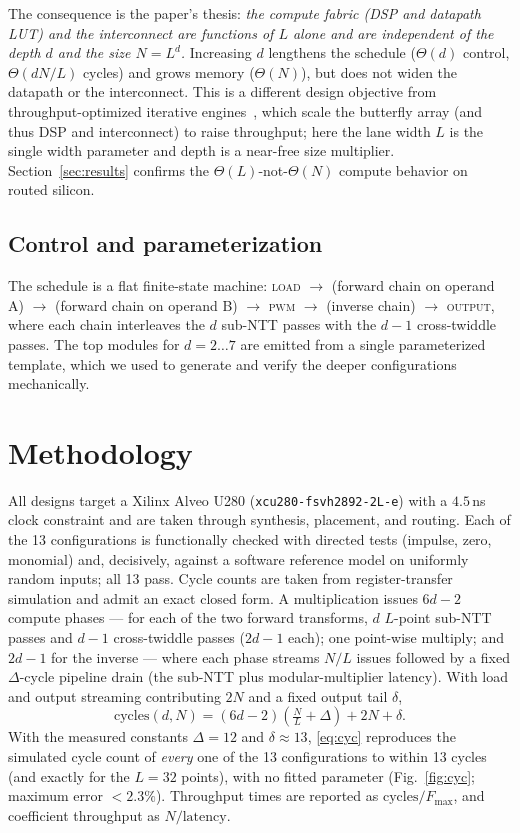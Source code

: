 \documentclass[conference]{IEEEtran}
\begin{document}
The consequence is the paper's thesis: \emph{the compute fabric (DSP and
datapath LUT) and the interconnect are functions of $L$ alone and are
independent of the depth $d$ and the size $N=L^{d}$.} Increasing $d$ lengthens
the schedule ($\Theta(d)$ control, $\Theta(dN/L)$ cycles) and grows memory
($\Theta(N)$), but does not widen the datapath or the interconnect. This is a
different design objective from throughput-optimized iterative
engines~\cite{xing2025}, which scale the butterfly array (and thus DSP and
interconnect) to raise throughput; here the lane width $L$ is the single width
parameter and depth is a near-free size multiplier. Section~\ref{sec:results}
confirms the $\Theta(L)$-not-$\Theta(N)$ compute behavior on routed silicon.

\subsection{Control and parameterization}
The schedule is a flat finite-state machine:
\textsc{load} $\rightarrow$ (forward chain on operand A) $\rightarrow$ (forward
chain on operand B) $\rightarrow$ \textsc{pwm} $\rightarrow$ (inverse chain)
$\rightarrow$ \textsc{output}, where each chain interleaves the $d$ sub-NTT
passes with the $d-1$ cross-twiddle passes. The top modules for $d=2\ldots7$ are
emitted from a single parameterized template, which we used to generate and
verify the deeper configurations mechanically.

\section{Methodology}\label{sec:method}
All designs target a Xilinx Alveo U280 (\texttt{xcu280-fsvh2892-2L-e}) with a
$4.5$\,ns clock constraint and are taken through synthesis, placement, and
routing. Each of the 13 configurations is functionally checked with directed
tests (impulse, zero, monomial) and, decisively, against a software reference
model on uniformly random inputs; all 13 pass. Cycle counts are taken from
register-transfer simulation and admit an exact closed form. A multiplication
issues $6d-2$ compute phases --- for each of the two forward transforms, $d$
$L$-point sub-NTT passes and $d-1$ cross-twiddle passes ($2d-1$ each); one
point-wise multiply; and $2d-1$ for the inverse --- where each phase streams
$N/L$ issues followed by a fixed $\Delta$-cycle pipeline drain (the sub-NTT plus
modular-multiplier latency). With load and output streaming contributing $2N$
and a fixed output tail $\delta$,
\begin{equation}
\mathrm{cycles}(d,N)=(6d-2)\!\left(\tfrac{N}{L}+\Delta\right)+2N+\delta .
\label{eq:cyc}
\end{equation}
With the measured constants $\Delta=12$ and $\delta\approx13$, \eqref{eq:cyc}
reproduces the simulated cycle count of \emph{every} one of the 13
configurations to within 13 cycles (and exactly for the $L=32$ points), with no
fitted parameter (Fig.~\ref{fig:cyc}; maximum error $<2.3\%$). Throughput times
are reported as $\mathrm{cycles}/F_{\max}$, and coefficient throughput as
$N/\text{latency}$.
\end{document}
